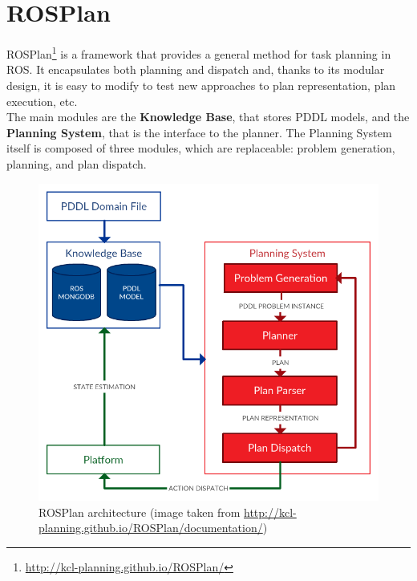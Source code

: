 \documentclass[pdftex,12pt,a4paper]{report}
\begin{document}
\section{ROSPlan}\label{sec:rosplan}
ROSPlan\cite{cashmore2015rosplan}\footnote{\url{http://kcl-planning.github.io/ROSPlan/}} is a framework that provides a general method for task planning in ROS.
It encapsulates both planning and dispatch and, thanks to its modular design, it is easy to modify to test new approaches to plan representation, plan execution, etc.\\
The main modules are the \textbf{Knowledge Base}, that stores PDDL models, and the \textbf{Planning System}, that is the interface to the planner. The Planning System itself is composed of three modules, which are replaceable: problem generation, planning, and plan dispatch. 
\begin{figure}[H]
	\centering
	\includegraphics[scale=0.4]{images/overview.png}
	\caption{ROSPlan architecture (image taken from \url{http://kcl-planning.github.io/ROSPlan/documentation/})}
\end{figure} 
\end{document}
